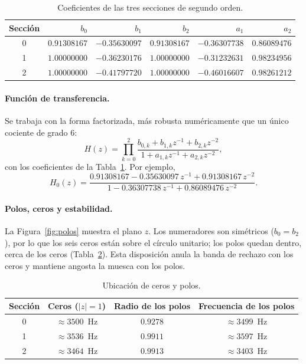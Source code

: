 \begin{table}[h]
\centering
\begin{tabular}{|c|r|r|r|r|r|}
\hline
\textbf{Sección} & $b_0$ & $b_1$ & $b_2$ & $a_1$ & $a_2$ \\ \hline
0 & $0.91308167$ & $-0.35630097$ & $0.91308167$ & $-0.36307738$ & $0.86089476$ \\ \hline
1 & $1.00000000$ & $-0.36230176$ & $1.00000000$ & $-0.31232631$ & $0.98234956$ \\ \hline
2 & $1.00000000$ & $-0.41797720$ & $1.00000000$ & $-0.46016607$ & $0.98261212$ \\ \hline
\end{tabular}
\caption{Coeficientes de las tres secciones de segundo orden.}
\label{tab:coef}
\end{table}

\paragraph{Función de transferencia.} Se trabaja con la forma factorizada, más robusta numéricamente que un único cociente de grado 6:
\begin{equation}
H(z) = \prod_{k=0}^{2} \frac{b_{0,k} + b_{1,k} z^{-1} + b_{2,k} z^{-2}}{1 + a_{1,k} z^{-1} + a_{2,k} z^{-2}},
\end{equation}
con los coeficientes de la Tabla~\ref{tab:coef}. Por ejemplo,
\begin{equation}
H_0(z) = \frac{0.91308167 - 0.35630097\, z^{-1} + 0.91308167\, z^{-2}}{1 - 0.36307738\, z^{-1} + 0.86089476\, z^{-2}}.
\end{equation}

\paragraph{Polos, ceros y estabilidad.} La Figura~\ref{fig:polos} muestra el plano $z$. Los numeradores son simétricos ($b_0 = b_2$), por lo que los seis ceros están sobre el círculo unitario; los polos quedan dentro, cerca de los ceros (Tabla~\ref{tab:pz}). Esta disposición anula la banda de rechazo con los ceros y mantiene angosta la muesca con los polos.

\begin{table}[h]
\centering
\begin{tabular}{|c|c|c|c|}
\hline
\textbf{Sección} & \textbf{Ceros ($|z|=1$)} & \textbf{Radio de los polos} & \textbf{Frecuencia de los polos} \\ \hline
0 & $\approx 3500$~Hz & $0.9278$ & $\approx 3499$~Hz \\ \hline
1 & $\approx 3536$~Hz & $0.9911$ & $\approx 3597$~Hz \\ \hline
2 & $\approx 3464$~Hz & $0.9913$ & $\approx 3403$~Hz \\ \hline
\end{tabular}
\caption{Ubicación de ceros y polos.}
\label{tab:pz}
\end{table}

